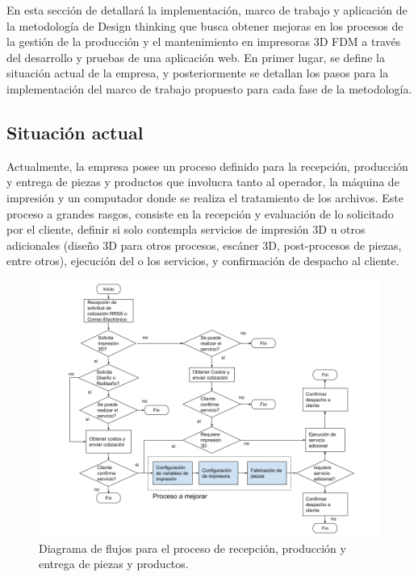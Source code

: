 En esta sección de detallará la implementación, marco de trabajo y aplicación de la metodología de Design thinking que busca obtener mejoras en los procesos de la gestión de la producción y el mantenimiento en impresoras 3D FDM a través del desarrollo y pruebas de una aplicación web. En primer lugar, se define la situación actual de la empresa, y posteriormente se detallan los pasos para la implementación del marco de trabajo propuesto para cada fase de la metodología.

\subsection{Situación actual}

Actualmente, la empresa posee un proceso definido para la recepción, producción y entrega de piezas y productos que involucra tanto al operador, la máquina de impresión y un computador donde se realiza el tratamiento de los archivos. Este proceso a grandes rasgos, consiste en la recepción y evaluación de lo solicitado por el cliente, definir si solo contempla servicios de impresión 3D u otros adicionales (diseño 3D para otros procesos, escáner 3D, post-procesos de piezas, entre otros), ejecución del o los servicios, y confirmación de despacho al cliente.  

\begin{figure}[H]
\centering
\includegraphics[scale=0.4]{images/procesosdiag.png}
\caption{Diagrama de flujos para el proceso de recepción, producción y entrega de piezas y productos.}
\label{procesosdiag}
\end{figure}


